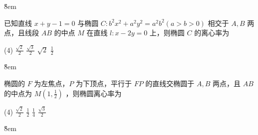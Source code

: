\v{8em}

\begin{example}
    已知直线 $x+y-1=0$ 与椭圆 $C: b^2 x^2+a^2 y^2=a^2 b^2(a>b>0)$ 相交于 $A, B$ 两点，且线段 $A B$ 的中点 $M$ 在直线 $l: x-2 y=0$ 上，则椭圆 $C$ 的离心率为
    \begin{tasks}(4)
        \task $\frac{\sqrt{2}}{2}$
        \task $\frac{\sqrt{3}}{2}$
        \task $\sqrt{2}$
        \task $\frac{1}{2}$
    \end{tasks}
\end{example}

\v{8em}

\begin{example}
    椭圆的 $F$ 为左焦点，$P$ 为下顶点，平行于 $F P$ 的直线交椭圆于 $A, B$ 两点，且 $A B$ 的中点为 $M\left(1, \frac{1}{2}\right)$ ，则椭圆离心率为
    \begin{tasks}(4)
        \task $\frac{\sqrt{2}}{2}$
        \task $\frac{1}{2}$
        \task $\frac{1}{4}$
        \task $\frac{\sqrt{3}}{2}$
    \end{tasks}
\end{example}

\v{8em}